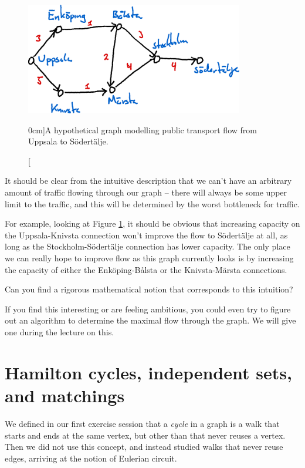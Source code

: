 \documentclass[nobib]{tufte-handout}
\begin{document}
\begin{figure}
  \centering
  \includegraphics[width=0.85\textwidth]{graphics/L5_exc_MSTs_etc/train_network_flow.png}
  \caption[][0cm]{A hypothetical graph modelling public transport flow from Uppsala to Södertälje.}
  \label{fig:uppsala_stockholm_traffic}
\end{figure}

\begin{xca}
  It should be clear from the intuitive description that we can't have an arbitrary amount of traffic flowing through our graph -- there will always be some upper limit to the traffic, and this will be determined by the worst bottleneck for traffic. 
  
  For example, looking at Figure \ref{fig:uppsala_stockholm_traffic}, it should be obvious that increasing capacity on the Uppsala-Knivsta connection won't improve the flow to Södertälje at all, as long as the Stockholm-Södertälje connection has lower capacity. The only place we can really hope to improve flow as this graph currently looks is by increasing the capacity of either the Enköping-Bålsta or the Knivsta-Märsta connections.
  
  Can you find a rigorous mathematical notion that corresponds to this intuition?
\end{xca}

If you find this interesting or are feeling ambitious, you could even try to figure out an algorithm to determine the maximal flow through the graph. We will give one during the lecture on this.

\section{Hamilton cycles, independent sets, and matchings}

We defined in our first exercise session that a \emph{cycle} in a graph is a walk that starts and ends at the same vertex, but other than that never reuses a vertex. Then we did not use this concept, and instead studied walks that never reuse edges, arriving at the notion of Eulerian circuit.
\end{document}
